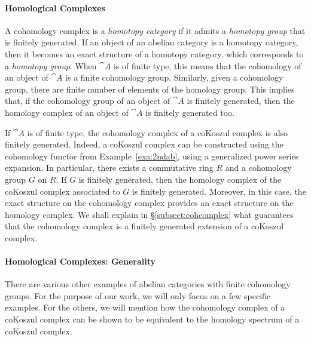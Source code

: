 \documentclass[a4paper,reqno,oneside]{article}
\begin{document}
\paragraph{Homological Complexes}
A cohomology complex is a \emph{homotopy category} if it admits a \emph{homotopy group} that is finitely generated. If an object of an abelian category is a homotopy category, then it becomes an exact structure of a homotopy category, which corresponds to a \emph{homotopy group}. When $\cat{A}$ is of finite type, this means that the cohomology of an object of $\cat{A}$ is a finite cohomology group. Similarly, given a cohomology group, there are finite number of elements of the homology group. This implies that, if the cohomology group of an object of $\cat{A}$ is finitely generated, then the homology complex of an object of $\cat{A}$ is finitely generated too.

If $\cat{A}$ is of finite type, the cohomology complex of a coKoszul complex is also finitely generated. Indeed, a coKoszul complex can be constructed using the cohomology functor from Example~\ref{exa:2ndab}, using a generalized power series expansion. In particular, there exists a commutative ring $R$ and a cohomology group $G$ on $R$. If $G$ is finitely generated, then the homology complex of the coKoszul complex associated to $G$ is finitely generated. Moreover, in this case, the exact structure on the cohomology complex provides an exact structure on the homology complex. We shall explain in \S\ref{subsect:cohcomplex} what guarantees that the cohomology complex is a finitely generated extension of a coKoszul complex. 

\paragraph{Homological Complexes: Generality}
There are various other examples of abelian categories with finite cohomology groups. For the purpose of our work, we will only focus on a few specific examples. For the others, we will mention how the cohomology complex of a coKoszul complex can be shown to be equivalent to the homology spectrum of a coKoszul complex.
\end{document}
